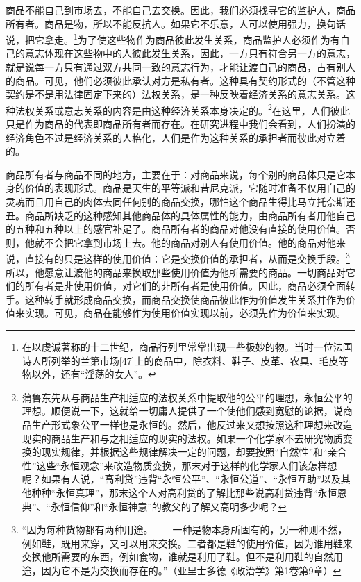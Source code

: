 \documentclass{ctexbook}
\begin{document}
商品不能自己到市场去，不能自己去交换。因此，我们必须找寻它的监护人，商品所有者。商品是物，所以不能反抗人。如果它不乐意，人可以使用强力，换句话说，把它拿走。\footnote{在以虔诚著称的十二世纪，商品行列里常常出现一些极妙的物。当时一位法国诗人所列举的兰第市场[47]上的商品中，除衣料、鞋子、皮革、农具、毛皮等物以外，还有“淫荡的女人”。}为了使这些物作为商品彼此发生关系，商品监护人必须作为有自己的意志体现在这些物中的人彼此发生关系，因此，一方只有符合另一方的意志，就是说每一方只有通过双方共同一致的意志行为，才能让渡自己的商品，占有别人的商品。可见，他们必须彼此承认对方是私有者。这种具有契约形式的（不管这种契约是不是用法律固定下来的）法权关系，是一种反映着经济关系的意志关系。这种法权关系或意志关系的内容是由这种经济关系本身决定的。\footnote{蒲鲁东先从与商品生产相适应的法权关系中提取他的公平的理想，永恒公平的理想。顺便说一下，这就给一切庸人提供了一个使他们感到宽慰的论据，说商品生产形式象公平一样也是永恒的。然后，他反过来又想按照这种理想来改造现实的商品生产和与之相适应的现实的法权。如果一个化学家不去研究物质变换的现实规律，并根据这些规律解决一定的问题，却要按照“自然性”和“亲合性”这些“永恒观念”来改造物质变换，那末对于这样的化学家人们该怎样想呢？如果有人说，“高利贷”违背“永恒公平”、“永恒公道”、“永恒互助”以及其他种种“永恒真理”，那末这个人对高利贷的了解比那些说高利贷违背“永恒恩典”、“永恒信仰”和“永恒神意”的教父的了解又高明多少呢？}在这里，人们彼此只是作为商品的代表即商品所有者而存在。在研究进程中我们会看到，人们扮演的经济角色不过是经济关系的人格化，人们是作为这种关系的承担者而彼此对立着的。

商品所有者与商品不同的地方，主要在于：对商品来说，每个别的商品体只是它本身的价值的表现形式。商品是天生的平等派和昔尼克派，它随时准备不仅用自己的灵魂而且用自己的肉体去同任何别的商品交换，哪怕这个商品生得比马立托奈斯还丑。商品所缺乏的这种感知其他商品体的具体属性的能力，由商品所有者用他自己的五种和五种以上的感官补足了。商品所有者的商品对他没有直接的使用价值。否则，他就不会把它拿到市场上去。他的商品对别人有使用价值。他的商品对他来说，直接有的只是这样的使用价值：它是交换价值的承担者，从而是交换手段。\footnote{“因为每种货物都有两种用途。——一种是物本身所固有的，另一种则不然，例如鞋，既用来穿，又可以用来交换。二者都是鞋的使用价值，因为谁用鞋来交换他所需要的东西，例如食物，谁就是利用了鞋。但不是利用鞋的自然用途，因为它不是为交换而存在的。”（亚里士多德《政治学》第1卷第9章）}所以，他愿意让渡他的商品来换取那些使用价值为他所需要的商品。一切商品对它们的所有者是非使用价值，对它们的非所有者是使用价值。因此，商品必须全面转手。这种转手就形成商品交换，而商品交换使商品彼此作为价值发生关系并作为价值来实现。可见，商品在能够作为使用价值实现以前，必须先作为价值来实现。
\end{document}
